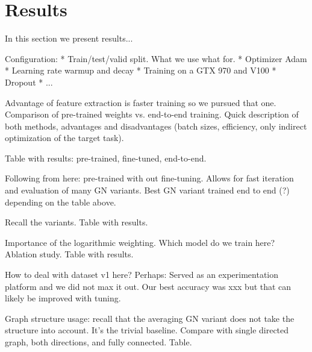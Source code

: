 \section{Results}

In this section we present results...

Configuration:
* Train/test/valid split. What we use what for.
* Optimizer Adam
* Learning rate warmup and decay
* Training on a GTX 970 and V100
* Dropout
* ...

Advantage of feature extraction is faster training so we pursued that one. Comparison of pre-trained weights vs. end-to-end training. Quick description of both methods, advantages and disadvantages (batch sizes, efficiency, only indirect optimization of the target task).

Table with results: pre-trained, fine-tuned, end-to-end.

Following from here: pre-trained with out fine-tuning. Allows for fast iteration and evaluation of many GN variants. Best GN variant trained end to end (?) depending on the table above.

Recall the variants. Table with results.

Importance of the logarithmic weighting. Which model do we train here? Ablation study. Table with results.

How to deal with dataset v1 here? Perhaps: Served as an experimentation platform and we did not max it out. Our best accuracy was xxx but that can likely be improved with tuning.

Graph structure usage: recall that the averaging GN variant does not take the structure into account. It's the trivial baseline. Compare with single directed graph, both directions, and fully connected. Table.
